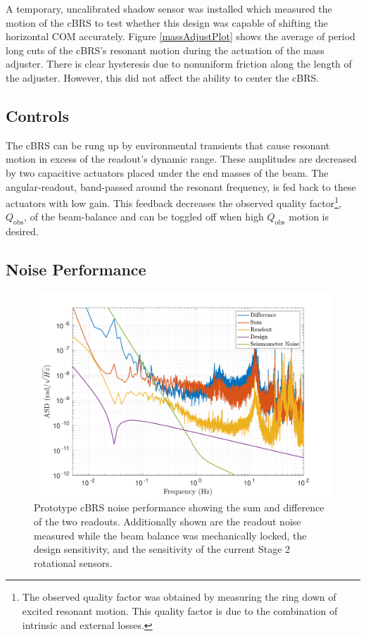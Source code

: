 \documentclass [12pt, proquest]{uwthesis}[2019]
\begin{document}
A temporary, uncalibrated shadow sensor was installed which measured the motion of the cBRS to test whether this design was capable of shifting the horizontal COM accurately. Figure \ref{massAdjustPlot} shows the average of period long cuts of the cBRS's resonant motion during the actuation of the mass adjuster. There is clear hysteresis due to nonuniform friction along the length of the adjuster. However, this did not affect the ability to center the cBRS. 

\subsection{Controls}

The cBRS can be rung up by environmental transients that cause resonant motion in excess of the readout's dynamic range. These amplitudes are decreased by two capacitive actuators placed under the end masses of the beam. The angular-readout, band-passed around the resonant frequency, is fed back to these actuators with low gain. This feedback decreases the observed quality factor\footnote{The observed quality factor was obtained by measuring the ring down of excited resonant motion. This quality factor is due to the combination of intrinsic and external losses.}, $Q_\text{obs}$, of the beam-balance and can be toggled off when high $Q_\text{obs}$ motion is desired. 

\subsection{Noise Performance}

\begin{figure}[!h]
\begin{center}
 \includegraphics[width=\textwidth]{cBRS_Noise.pdf}
\caption[Prototype cBRS noise performance]{Prototype cBRS noise performance showing the sum and difference of the two readouts. Additionally shown are the readout noise measured while the beam balance was mechanically locked, the design sensitivity, and the sensitivity of the current Stage 2 rotational sensors.}
\label{cBRS_noise}
\end{center}
\end{figure}
\end{document}
